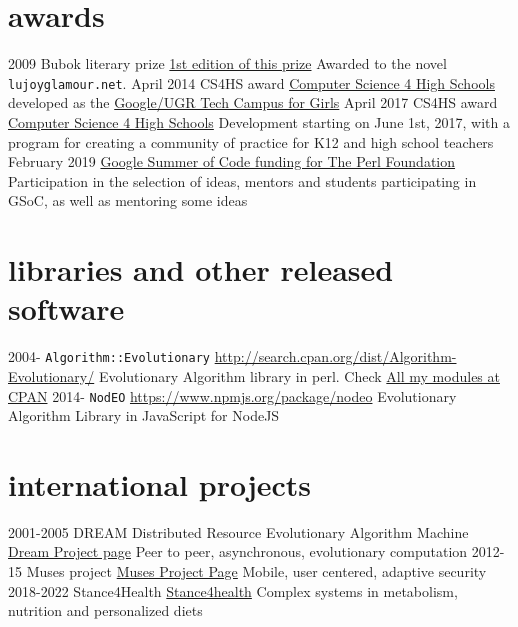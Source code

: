 \documentclass[]{friggeri-jj-cv}
\begin{document}
  \newpage
  
\section{awards}
\begin{entrylist}
 \entry
    {2009}
    {Bubok literary prize}
    {\href{http://cultura.elpais.com/cultura/2009/05/06/actualidad/1241560804_850215.html}{1st
        edition of this prize}}
    {Awarded to the novel {\tt lujoyglamour.net}.}
 \entry
    {April 2014}
    {CS4HS award}
    {\href{http://cs4hs.com}{Computer Science 4 High Schools}}
    {developed as the \href{http://cs4hs.ugr.es}{Google/UGR Tech Campus for Girls}}
 \entry
    {April 2017}
    {CS4HS award}
    {\href{http://cs4hs.com}{Computer Science 4 High Schools}}
    {Development starting on June 1st, 2017, with a program for
      creating a community of practice for K12 and high school
      teachers}
    \entry
    {February 2019}
    {\href{https://summerofcode.withgoogle.com/organizations/4713351599357952/}{Google
        Summer of Code funding for The Perl Foundation}}
    {Participation in the selection of ideas, mentors and students
      participating in GSoC, as well as mentoring some ideas}
    
\end{entrylist}


\section{libraries and other released software}

\begin{entrylist}
  \entry
    {2004-}
    {{\tt Algorithm::Evolutionary}}
    {\href{http://search.cpan.org/dist/Algorithm-Evolutionary/}{http://search.cpan.org/dist/Algorithm-Evolutionary/}}
    {Evolutionary Algorithm library in
      perl. Check \href{http://search.cpan.org/~jmerelo/}{All my modules at CPAN}}
  \entry
    {2014-}
    {{\tt NodEO}}
    {\href{https://npmjs.org/package/nodeo}{https://www.npmjs.org/package/nodeo}}
    {Evolutionary Algorithm Library in JavaScript for NodeJS}
\end{entrylist}

\section{international projects}

\begin{entrylist}
  \entry
    {2001-2005}
    {{\sf DREAM} Distributed Resource Evolutionary Algorithm Machine}
    {\href{http://www.soc.napier.ac.uk/~benp/dream/dream.htm}{Dream
        Project page}}
    {Peer to peer, asynchronous, evolutionary computation}
  \entry
    {2012-15}
    {Muses project}
    {\href{https://musesproject.eu/}{Muses Project Page}}
    {Mobile, user centered, adaptive security}
    \entry
    {2018-2022}
    {Stance4Health}
    {\href{https://stance4health.com}{Stance4health}}
    {Complex systems in metabolism, nutrition and personalized diets}
\end{entrylist}
\end{document}
